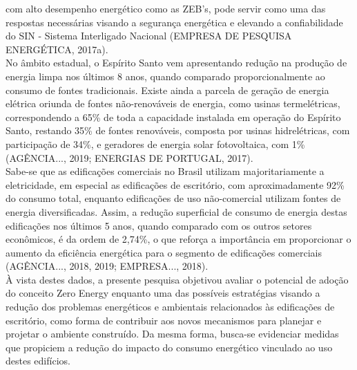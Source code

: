      com  alto  desempenho energético como as ZEB’s, pode servir como uma das respostas necessárias 
     visando a segurança energética  e  elevando  a  confiabilidade  do  SIN  -  Sistema  Interligado
     Nacional  (EMPRESA  DE PESQUISA ENERGÉTICA, 2017a).\\ No âmbito estadual, o Espírito Santo 
     vem apresentando redução na produção de energia limpa nos últimos 8 anos, quando comparado 
     proporcionalmente ao consumo de fontes tradicionais. Existe ainda a parcela de geração de 
     energia elétrica oriunda de fontes não-renováveis de energia, como usinas termelétricas, 
     correspondendo a 65\% de toda a capacidade instalada em operação do  Espírito  Santo,  
     restando  35\%  de  fontes  renováveis,  composta  por  usinas  hidrelétricas,  com 
     participação  de  34\%,  e  geradores  de  energia  solar  fotovoltaica,  com  1\%  
     (AGÊNCIA...,  2019; ENERGIAS DE PORTUGAL, 2017).\\ Sabe-se  que  as  edificações  comerciais  
     no  Brasil  utilizam  majoritariamente  a  eletricidade,  em especial  as  edificações  de  
     escritório,  com  aproximadamente  92\%  do  consumo  total,  enquanto edificações  de  
     uso  não-comercial  utilizam  fontes  de  energia  diversificadas.  Assim,  a  redução 
     superficial de consumo de energia destas edificações nos últimos 5 anos, quando comparado 
     com os  outros  setores  econômicos,  é  da  ordem  de  2,74\%,  o  que  reforça  a  
     importância  em proporcionar  o  aumento  da  eficiência  energética  para  o  segmento  
     de  edificações  comerciais (AGÊNCIA..., 2018, 2019; EMPRESA..., 2018).\\ À vista  destes  
     dados,  a presente pesquisa objetivou avaliar  o  potencial de adoção  do  conceito Zero  
     Energy   enquanto   uma  das  possíveis   estratégias  visando   a   redução   dos  
     problemas energéticos e ambientais relacionados às edificações de escritório, como forma 
     de contribuir aos novos mecanismos para planejar e projetar o ambiente construído. Da mesma 
     forma, busca-se evidenciar  medidas que propiciem  a  redução  do impacto  do  consumo  
     energético  vinculado  ao uso destes edifícios. 